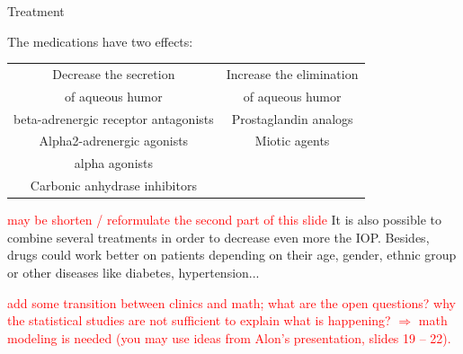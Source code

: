 \begin{frame}[shrink=5]{Treatment}

The medications have two effects:
\newline
\\
\begin{tabular}{|c|c|}
\hline
Decrease the secretion & Increase the elimination \\
of aqueous humor &  of aqueous humor\\
\hline
beta-adrenergic receptor antagonists & Prostaglandin analogs \\
Alpha2-adrenergic agonists & Miotic agents \\
alpha agonists &  \\
Carbonic anhydrase inhibitors &  \\
\hline
\end{tabular}
\newline
\newline

\textcolor{red}{may be shorten / reformulate the second part of this slide}
It is also possible to combine several treatments in order to decrease even more the IOP.
Besides, drugs could work better on patients depending on their age, gender, ethnic group or other diseases like diabetes, hypertension...

\end{frame}

\begin{frame}

\textcolor{red}{add some transition between clinics and math; what are the open questions?
why the statistical studies are not sufficient to explain what is happening? $\Rightarrow$ math modeling
is needed (you may use ideas from Alon's presentation, slides 19 -- 22).}
\end{frame}



